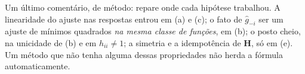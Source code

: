 \begin{solucao}
Um último comentário, de método: repare onde cada hipótese trabalhou. A linearidade do
ajuste nas respostas entrou em (a) e (c); o fato de $\widehat g_{-i}$ ser um ajuste de
mínimos quadrados \emph{na mesma classe de funções}, em (b); o posto cheio, na
unicidade de (b) e em $h_{ii}\neq1$; a simetria e a idempotência de $\bm H$, só em (e).
Um método que não tenha alguma dessas propriedades não herda a fórmula
automaticamente.
\end{solucao}
